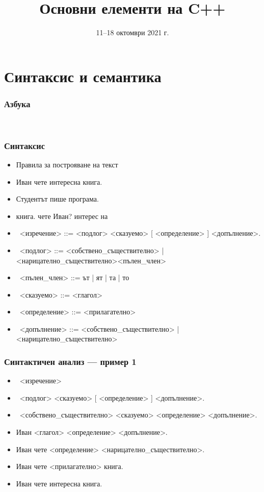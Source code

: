 \documentclass[alsotrans]{beamerswitch}
\title{Основни елементи на C++}
\date{11--18 октомври 2021 г.}
\begin{document}
\begin{frame}
  \titlepage
\end{frame}

\section{Синтаксис и семантика}

\begin{frame}
  \frametitle{Азбука}
  \begin{center}
    \\[2em]
  \end{center}
\end{frame}

\begin{frame}
  \frametitle{Синтаксис}
  \begin{itemize}[<+->]
  \item Правила за построяване на текст
  \item \alert{Иван чете интересна книга.}
  \item \alert{Студентът пише програма.}
  \item \alert{книга. чете Иван? интерес на}
  \item\ <изречение> ::= <подлог> <сказуемо> [ <определение> ] <допълнение>\alert.
  \item\ <подлог> ::= <собствено\_съществително> | <нарицателно\_съществително><пълен\_член>
  \item\ <пълен\_член> ::= \alert{ът} | \alert{ят} | \alert{та} | \alert{то}
  \item\ <сказуемо> ::= <глагол>
  \item\ <определение> ::= <прилагателно>
  \item\ <допълнение> ::= <собствено\_съществително> | <нарицателно\_съществително>
  \end{itemize}
\end{frame}

\begin{frame}
  \frametitle{Синтактичен анализ — пример 1}
  \begin{itemize}[<+->]
  \item\ <изречение>
  \item\ <подлог> <сказуемо> [ <определение> ] <допълнение>\alert.
  \item\ <собствено\_съществително> <сказуемо> <определение> <допълнение>\alert.
  \item \alert{Иван} <глагол> <определение> <допълнение>\alert.
  \item \alert{Иван чете} <определение> <нарицателно\_съществително>\alert.
  \item \alert{Иван чете} <прилагателно> \alert{книга.}
  \item \alert{Иван чете интересна книга.}
  \end{itemize}
\end{frame}
\end{document}
